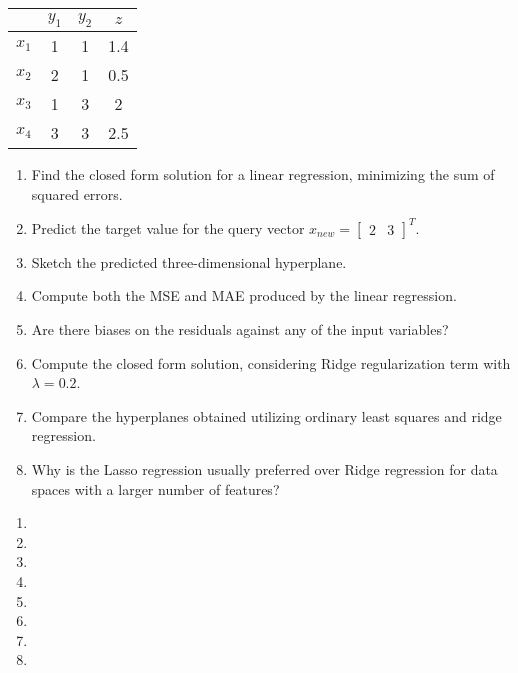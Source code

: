 \documentclass[12pt]{article}
\begin{document}
\begin{enumerate}[leftmargin=\labelsep]
{        \begin{table}[H]
          \centering
          \begin{tabular}{c|c|c|c}
                  & $y_1$ & $y_2$ & $z$ \\ \hline
            $x_1$ & 1     & 1     & 1.4 \\
            $x_2$ & 2     & 1     & 0.5 \\
            $x_3$ & 1     & 3     & 2   \\
            $x_4$ & 3     & 3     & 2.5
          \end{tabular}
        \end{table}

        \begin{enumerate}
          \item Find the closed form solution for a linear regression, minimizing the
                sum of squared errors.
          \item Predict the target value for the query vector $x_{new} = \begin{bmatrix} 2 & 3 \end{bmatrix}^T$.
          \item Sketch the predicted three-dimensional hyperplane.
          \item Compute both the MSE and MAE produced by the linear regression.
          \item Are there biases on the residuals against any of the input variables?
          \item Compute the closed form solution, considering Ridge regularization term with $\lambda = 0.2$.
          \item Compare the hyperplanes obtained utilizing ordinary least squares and ridge regression.
          \item Why is the Lasso regression usually preferred over Ridge regression for data spaces with a larger number of features?
        \end{enumerate}
        }

        \begin{enumerate}
          \item {}
          \item {}
          \item {}
          \item {}
          \item {}
          \item {}
          \item {}
          \item {}
        \end{enumerate}


\end{enumerate}
\end{document}
